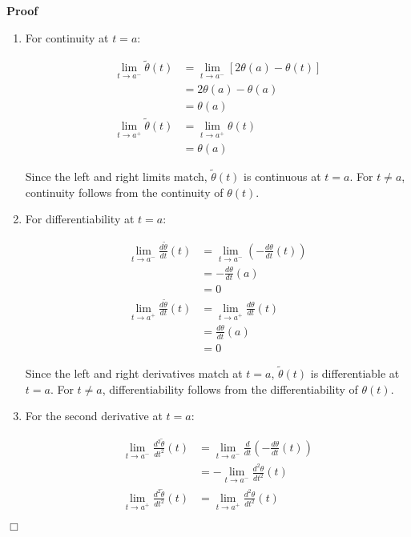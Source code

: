 \documentclass{article}
\newenvironment{proof}{\noindent\textbf{Proof\ }}{\hspace*{\fill}$\Box$\medskip}
\begin{document}
\begin{proof}
  \\
  
  \begin{enumerate}
    \item For continuity at $t = a$:
    
    \begin{align}
      \lim_{t \to a^-}  \tilde{\theta} (t) & = \lim_{t \to a^-} [2 \theta (a)
      - \theta (t)] \\
      & = 2 \theta (a) - \theta (a) \\
      & = \theta (a) \\
      \lim_{t \to a^+}  \tilde{\theta} (t) & = \lim_{t \to a^+} \theta (t) \\
      & = \theta (a) 
    \end{align}
    
    Since the left and right limits match, $\tilde{\theta} (t)$ is continuous
    at $t = a$. For $t \neq a$, continuity follows from the continuity of
    $\theta (t)$.
    
    \item For differentiability at $t = a$:
    
    \begin{align}
      \lim_{t \to a^-}  \frac{d \tilde{\theta}}{dt} (t) & = \lim_{t \to a^-}
      \left( - \frac{d \theta}{dt} (t) \right) \\
      & = - \frac{d \theta}{dt} (a) \\
      & = 0 \\
      \lim_{t \to a^+}  \frac{d \tilde{\theta}}{dt} (t) & = \lim_{t \to a^+} 
      \frac{d \theta}{dt} (t) \\
      & = \frac{d \theta}{dt} (a) \\
      & = 0 
    \end{align}
    
    Since the left and right derivatives match at $t = a$, $\tilde{\theta}
    (t)$ is differentiable at $t = a$. For $t \neq a$, differentiability
    follows from the differentiability of $\theta (t)$.
    
    \item For the second derivative at $t = a$:
    
    \begin{align}
      \lim_{t \to a^-}  \frac{d^2  \tilde{\theta}}{dt^2} (t) & = \lim_{t \to
      a^-}  \frac{d}{dt}  \left( - \frac{d \theta}{dt} (t) \right) \\
      & = - \lim_{t \to a^-}  \frac{d^2 \theta}{dt^2} (t) \\
      \lim_{t \to a^+}  \frac{d^2  \tilde{\theta}}{dt^2} (t) & = \lim_{t \to
      a^+}  \frac{d^2 \theta}{dt^2} (t) 
    \end{align}
    

\end{enumerate}
\end{proof}
\end{document}
